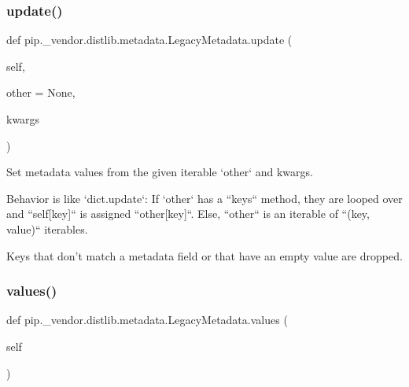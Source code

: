 \subsubsection{\texorpdfstring{update()}{update()}}
{\footnotesize\ttfamily def pip.\+\_\+vendor.\+distlib.\+metadata.\+Legacy\+Metadata.\+update (\begin{DoxyParamCaption}\item[{}]{self,  }\item[{}]{other = {\ttfamily None},  }\item[{}]{kwargs }\end{DoxyParamCaption})}

\begin{DoxyVerb}Set metadata values from the given iterable `other` and kwargs.

Behavior is like `dict.update`: If `other` has a ``keys`` method,
they are looped over and ``self[key]`` is assigned ``other[key]``.
Else, ``other`` is an iterable of ``(key, value)`` iterables.

Keys that don't match a metadata field or that have an empty value are
dropped.
\end{DoxyVerb}
 \mbox{\label{classpip_1_1__vendor_1_1distlib_1_1metadata_1_1LegacyMetadata_a16fbb10c4986368f35f737299db137d2}} 
\subsubsection{\texorpdfstring{values()}{values()}}
{\footnotesize\ttfamily def pip.\+\_\+vendor.\+distlib.\+metadata.\+Legacy\+Metadata.\+values (\begin{DoxyParamCaption}\item[{}]{self }\end{DoxyParamCaption})}

\mbox{\label{classpip_1_1__vendor_1_1distlib_1_1metadata_1_1LegacyMetadata_a6b21f09baf95f38b5c15ed3cfb6d28a2}} 

